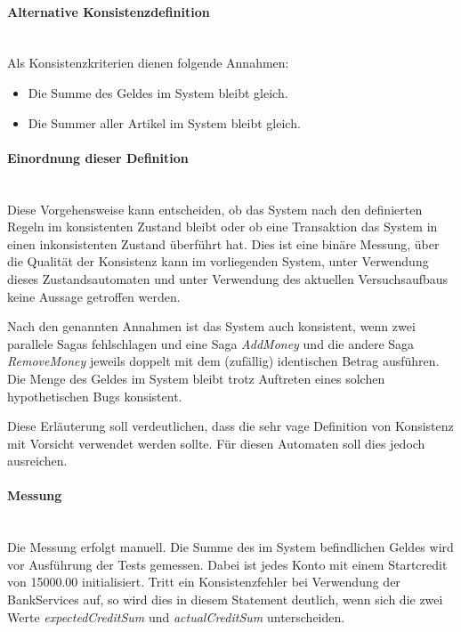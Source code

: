 \paragraph*{Alternative Konsistenzdefinition}\label{par:consistency_definition_alt} \mbox{}\\
Als Konsistenzkriterien dienen folgende Annahmen:
\begin{itemize}
	\item Die Summe des Geldes im System bleibt gleich.
	\item Die Summer aller Artikel im System bleibt gleich.
\end{itemize}

\paragraph*{Einordnung dieser Definition} \mbox{}\\
Diese Vorgehensweise kann entscheiden, ob das System nach den definierten Regeln im konsistenten Zustand bleibt oder ob eine Transaktion das System in einen inkonsistenten Zustand überführt hat. Dies ist eine binäre Messung, über die Qualität der Konsistenz kann im vorliegenden System, unter Verwendung dieses Zustandsautomaten und unter Verwendung des aktuellen Versuchsaufbaus keine Aussage getroffen werden. 

Nach den genannten Annahmen ist das System auch konsistent, wenn zwei parallele Sagas fehlschlagen und eine Saga \textit{AddMoney} und die andere Saga \textit{RemoveMoney} jeweils doppelt mit dem (zufällig) identischen Betrag ausführen. Die Menge des Geldes im System bleibt trotz Auftreten eines solchen hypothetischen Bugs konsistent. 

Diese Erläuterung soll verdeutlichen, dass die sehr vage Definition von Konsistenz mit Vorsicht verwendet werden sollte. Für diesen Automaten soll dies jedoch ausreichen. 

\paragraph*{Messung} \mbox{}\\
Die Messung erfolgt manuell. Die Summe des im System befindlichen Geldes wird vor Ausführung der Tests gemessen. Dabei ist jedes Konto mit einem Startcredit von 15000.00 initialisiert. Tritt ein Konsistenzfehler bei Verwendung der BankServices auf, so wird dies in diesem Statement deutlich, wenn sich die zwei Werte \textit{expectedCreditSum} und \textit{actualCreditSum} unterscheiden.

